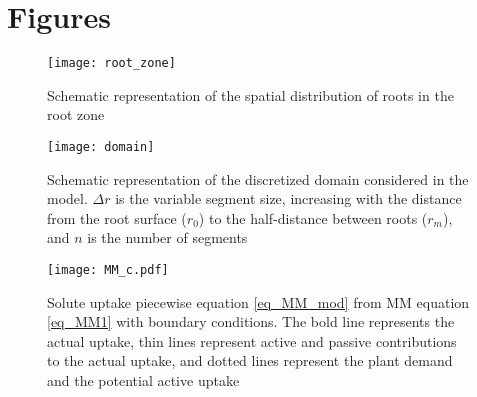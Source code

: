 \section*{Figures}

\begin{figure}[h]
\label{fig_rootzone}
\centering
\texttt{[image: root\_zone]}
\caption{Schematic representation of the spatial distribution of roots in the root zone}
\end{figure}

\begin{figure}[h]
\label{fig_scheme}
\centering
\texttt{[image: domain]}
\caption{Schematic representation of the discretized domain considered in the model. $\Delta r$ is the variable segment size, increasing with the distance from the root surface ($r_0$) to the half-distance between roots ($r_m$), and $n$ is the number of segments}
\end{figure}

\begin{figure}[h]
\label{fig_MM_mod}
\centering
\texttt{[image: MM\_c.pdf]}
\caption{Solute uptake piecewise equation \ref{eq_MM_mod} from MM equation \ref{eq_MM1} with boundary conditions. The bold line represents the actual uptake, thin lines represent active and passive contributions to the actual uptake, and dotted lines represent the plant demand and the potential active uptake}
\end{figure}


